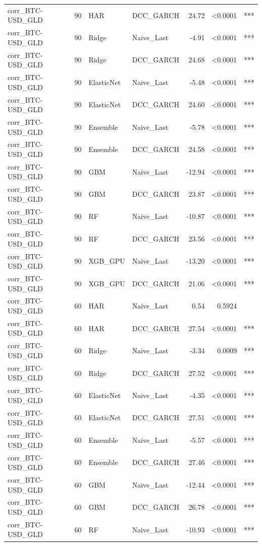 \begin{table}[H]
\begin{tabular}{llllrrl}
corr_BTC-USD_GLD & 90 & HAR & DCC_GARCH & 24.72 & <0.0001 & *** \\
corr_BTC-USD_GLD & 90 & Ridge & Naive_Last & -4.91 & <0.0001 & *** \\
corr_BTC-USD_GLD & 90 & Ridge & DCC_GARCH & 24.68 & <0.0001 & *** \\
corr_BTC-USD_GLD & 90 & ElasticNet & Naive_Last & -5.48 & <0.0001 & *** \\
corr_BTC-USD_GLD & 90 & ElasticNet & DCC_GARCH & 24.60 & <0.0001 & *** \\
corr_BTC-USD_GLD & 90 & Ensemble & Naive_Last & -5.78 & <0.0001 & *** \\
corr_BTC-USD_GLD & 90 & Ensemble & DCC_GARCH & 24.58 & <0.0001 & *** \\
corr_BTC-USD_GLD & 90 & GBM & Naive_Last & -12.94 & <0.0001 & *** \\
corr_BTC-USD_GLD & 90 & GBM & DCC_GARCH & 23.87 & <0.0001 & *** \\
corr_BTC-USD_GLD & 90 & RF & Naive_Last & -10.87 & <0.0001 & *** \\
corr_BTC-USD_GLD & 90 & RF & DCC_GARCH & 23.56 & <0.0001 & *** \\
corr_BTC-USD_GLD & 90 & XGB_GPU & Naive_Last & -13.20 & <0.0001 & *** \\
corr_BTC-USD_GLD & 90 & XGB_GPU & DCC_GARCH & 21.06 & <0.0001 & *** \\
corr_BTC-USD_GLD & 60 & HAR & Naive_Last & 0.54 & 0.5924 &  \\
corr_BTC-USD_GLD & 60 & HAR & DCC_GARCH & 27.54 & <0.0001 & *** \\
corr_BTC-USD_GLD & 60 & Ridge & Naive_Last & -3.34 & 0.0009 & *** \\
corr_BTC-USD_GLD & 60 & Ridge & DCC_GARCH & 27.52 & <0.0001 & *** \\
corr_BTC-USD_GLD & 60 & ElasticNet & Naive_Last & -4.35 & <0.0001 & *** \\
corr_BTC-USD_GLD & 60 & ElasticNet & DCC_GARCH & 27.51 & <0.0001 & *** \\
corr_BTC-USD_GLD & 60 & Ensemble & Naive_Last & -5.57 & <0.0001 & *** \\
corr_BTC-USD_GLD & 60 & Ensemble & DCC_GARCH & 27.46 & <0.0001 & *** \\
corr_BTC-USD_GLD & 60 & GBM & Naive_Last & -12.44 & <0.0001 & *** \\
corr_BTC-USD_GLD & 60 & GBM & DCC_GARCH & 26.78 & <0.0001 & *** \\
corr_BTC-USD_GLD & 60 & RF & Naive_Last & -10.93 & <0.0001 & *** \\

\end{tabular}
\end{table}
